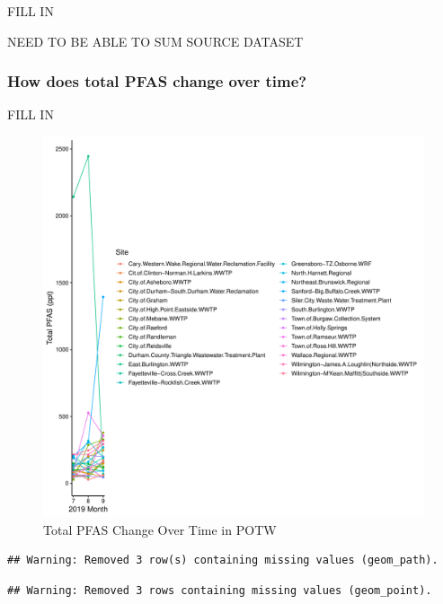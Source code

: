 \documentclass[
  12pt,
]{article}
\begin{document}
FILL IN

NEED TO BE ABLE TO SUM SOURCE DATASET

\hypertarget{how-does-total-pfas-change-over-time}{%
\subsubsection{How does total PFAS change over
time?}\label{how-does-total-pfas-change-over-time}}

FILL IN

\begin{figure}

\includegraphics{PFAS_FinalProject_files/figure-latex/unnamed-chunk-25-1} \hfill{}

\caption{Total PFAS Change Over Time in POTW}\label{fig:unnamed-chunk-25}
\end{figure}

\begin{verbatim}
## Warning: Removed 3 row(s) containing missing values (geom_path).
\end{verbatim}

\begin{verbatim}
## Warning: Removed 3 rows containing missing values (geom_point).
\end{verbatim}
\end{document}
